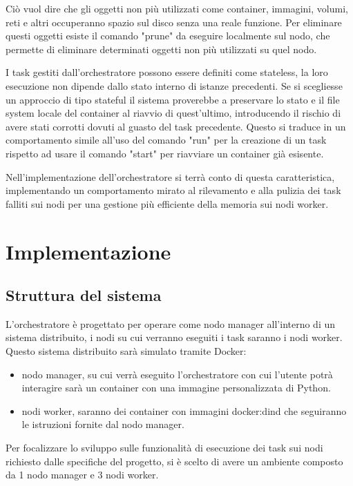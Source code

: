 \documentclass[12pt,a4paper]{article}
\begin{document}
Ciò vuol dire che gli oggetti non più utilizzati come container, immagini, volumi, reti e altri occuperanno spazio sul disco senza una reale funzione. Per eliminare questi oggetti esiste il comando "prune" da eseguire localmente sul nodo, che permette di eliminare determinati oggetti non più utilizzati su quel nodo.\cite{docker_pruning}

I task gestiti dall'orchestratore possono essere definiti come stateless, la loro esecuzione non dipende dallo stato interno di istanze precedenti. Se si scegliesse un approccio di tipo stateful il sistema proverebbe a preservare lo stato e il file system locale del container al riavvio di quest'ultimo, introducendo il rischio di avere stati corrotti dovuti al guasto del task precedente. Questo si traduce in un comportamento simile all'uso del comando "run" per la creazione di un task rispetto ad usare il comando "start" per riavviare un container già esisente.

Nell'implementazione dell'orchestratore si terrà conto di questa caratteristica, implementando un comportamento mirato al rilevamento e alla pulizia dei task falliti sui nodi per una gestione più efficiente della memoria sui nodi worker.
\newpage

\section{Implementazione}
\subsection{Struttura del sistema}
L'orchestratore è progettato per operare come nodo manager all'interno di un sistema distribuito, i nodi su cui verranno eseguiti i task saranno i nodi worker.\\
Questo sistema distribuito sarà simulato tramite Docker:
\begin{itemize}
    \item nodo manager, su cui verrà eseguito l'orchestratore con cui l'utente potrà interagire sarà un container con una immagine personalizzata di Python.
    \item nodi worker, saranno dei container con immagini docker:dind che seguiranno le istruzioni fornite dal nodo manager.
\end{itemize}

Per focalizzare lo sviluppo sulle funzionalità di esecuzione dei task sui nodi richiesto dalle specifiche del progetto, si è scelto di avere un ambiente composto da 1 nodo manager e 3 nodi worker.
\end{document}
